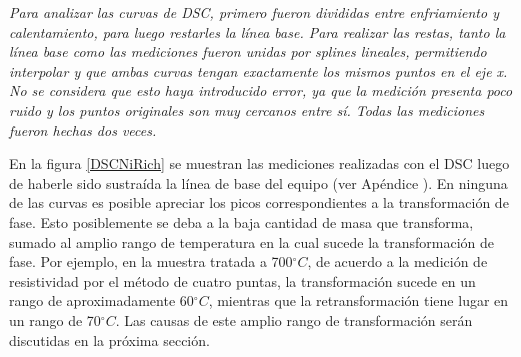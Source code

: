 \documentclass[12pt]{article}
\theoremstyle{definition}
\theoremstyle{remark}
\begin{document}
{\textit{Para analizar las curvas de DSC, primero fueron divididas entre enfriamiento y calentamiento, para luego restarles la línea base. Para realizar las restas, tanto la línea base como las mediciones fueron unidas por splines lineales, permitiendo interpolar y que ambas curvas tengan exactamente los mismos puntos en el eje x. No se considera que esto haya introducido error, ya que la medición presenta poco ruido y los puntos originales son muy cercanos entre sí. Todas las mediciones fueron hechas dos veces.}

En la figura \ref{DSCNiRich} se muestran las mediciones realizadas con el DSC luego de haberle sido sustraída la línea de base del equipo (ver Apéndice ). En ninguna de las curvas es posible apreciar los picos correspondientes a la transformación de fase. Esto posiblemente se deba a la baja cantidad de masa que transforma, sumado al amplio rango de temperatura en la cual sucede la transformación de fase. Por ejemplo, en la muestra tratada a 700$^\circ C$, de acuerdo a la medición de resistividad por el método de cuatro puntas, la transformación sucede en un rango de aproximadamente 60$^\circ C$, mientras que la retransformación tiene lugar en un rango de 70$^\circ C$. Las causas de este amplio rango de transformación serán discutidas en la próxima sección.

}
\end{document}
